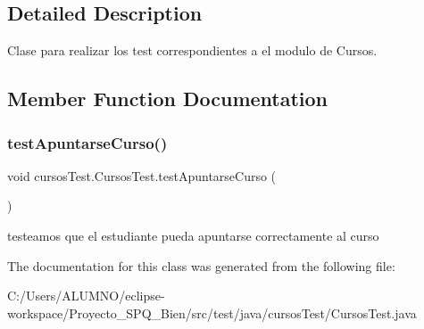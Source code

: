 \subsection{Detailed Description}
Clase para realizar los test correspondientes a el modulo de Cursos. 

\subsection{Member Function Documentation}
\mbox{\label{classcursos_test_1_1_cursos_test_a00119e43545f51cb6b31b9c9d8356836}} 
\subsubsection{\texorpdfstring{test\+Apuntarse\+Curso()}{testApuntarseCurso()}}
{\footnotesize\ttfamily void cursos\+Test.\+Cursos\+Test.\+test\+Apuntarse\+Curso (\begin{DoxyParamCaption}{ }\end{DoxyParamCaption})}

testeamos que el estudiante pueda apuntarse correctamente al curso 

The documentation for this class was generated from the following file\+:\begin{DoxyCompactItemize}
\item 
C\+:/\+Users/\+A\+L\+U\+M\+N\+O/eclipse-\/workspace/\+Proyecto\+\_\+\+S\+P\+Q\+\_\+Bien/src/test/java/cursos\+Test/Cursos\+Test.\+java\end{DoxyCompactItemize}
